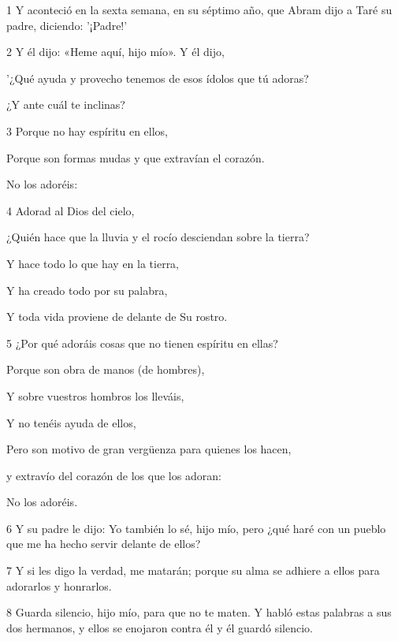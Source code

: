 \par 1 Y aconteció en la sexta semana, en su séptimo año, que Abram dijo a Taré su padre, diciendo: '¡Padre!'
\par 2 Y él dijo: «Heme aquí, hijo mío». Y él dijo,
\par    
\par     '¿Qué ayuda y provecho tenemos de esos ídolos que tú adoras?  
\par     ¿Y ante cuál te inclinas?
\par    
\par 3 Porque no hay espíritu en ellos,  
\par     Porque son formas mudas y que extravían el corazón.  
\par     No los adoréis:
\par    
\par 4 Adorad al Dios del cielo,  
\par     ¿Quién hace que la lluvia y el rocío desciendan sobre la tierra?  
\par     Y hace todo lo que hay en la tierra,
\par    
\par     Y ha creado todo por su palabra,  
\par     Y toda vida proviene de delante de Su rostro.
\par    
\par 5 ¿Por qué adoráis cosas que no tienen espíritu en ellas?  
\par     Porque son obra de manos (de hombres),
\par    
\par     Y sobre vuestros hombros los lleváis,  
\par     Y no tenéis ayuda de ellos,
\par    
\par     Pero son motivo de gran vergüenza para quienes los hacen,  
\par     y extravío del corazón de los que los adoran:  
\par     No los adoréis.
\par    
\par 6 Y su padre le dijo: Yo también lo sé, hijo mío, pero ¿qué haré con un pueblo que me ha hecho servir delante de ellos?
\par 7 Y si les digo la verdad, me matarán; porque su alma se adhiere a ellos para adorarlos y honrarlos.
\par 8 Guarda silencio, hijo mío, para que no te maten. Y habló estas palabras a sus dos hermanos, y ellos se enojaron contra él y él guardó silencio.
